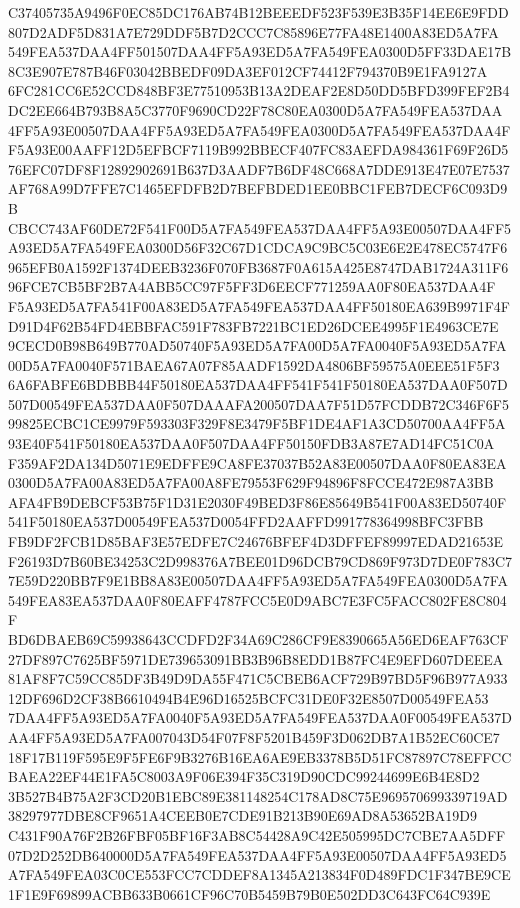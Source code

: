\documentclass[UTF8,fontset=fandol,zihao=-4,a4paper]{ctexart}
\begin{document}
{{C37405735A9496F0EC85DC176AB74B12BEEEDF523F539E3B35F14EE6E9FDD807D2ADF5D831A7E729DDF5B7D2CCC7C85896E77FA48E1400A83ED5A7FA
549FEA537DAA4FF501507DAA4FF5A93ED5A7FA549FEA0300D5FF33DAE17B8C3E907E787B46F03042BBEDF09DA3EF012CF74412F794370B9E1FA9127A
6FC281CC6E52CCD848BF3E77510953B13A2DEAF2E8D50DD5BFD399FEF2B4DC2EE664B793B8A5C3770F9690CD22F78C80EA0300D5A7FA549FEA537DAA
4FF5A93E00507DAA4FF5A93ED5A7FA549FEA0300D5A7FA549FEA537DAA4FF5A93E00AAFF12D5EFBCF7119B992BBECF407FC83AEFDA984361F69F26D5
76EFC07DF8F12892902691B637D3AADF7B6DF48C668A7DDE913E47E07E7537AF768A99D7FFE7C1465EFDFB2D7BEFBDED1EE0BBC1FEB7DECF6C093D9B
CBCC743AF60DE72F541F00D5A7FA549FEA537DAA4FF5A93E00507DAA4FF5A93ED5A7FA549FEA0300D56F32C67D1CDCA9C9BC5C03E6E2E478EC5747F6
965EFB0A1592F1374DEEB3236F070FB3687F0A615A425E8747DAB1724A311F696FCE7CB5BF2B7A4ABB5CC97F5FF3D6EECF771259AA0F80EA537DAA4F
F5A93ED5A7FA541F00A83ED5A7FA549FEA537DAA4FF50180EA639B9971F4FD91D4F62B54FD4EBBFAC591F783FB7221BC1ED26DCEE4995F1E4963CE7E
9CECD0B98B649B770AD50740F5A93ED5A7FA00D5A7FA0040F5A93ED5A7FA00D5A7FA0040F571BAEA67A07F85AADF1592DA4806BF59575A0EEE51F5F3
6A6FABFE6BDBBB44F50180EA537DAA4FF541F541F50180EA537DAA0F507D507D00549FEA537DAA0F507DAAAFA200507DAA7F51D57FCDDB72C346F6F5
99825ECBC1CE9979F593303F329F8E3479F5BF1DE4AF1A3CD50700AA4FF5A93E40F541F50180EA537DAA0F507DAA4FF50150FDB3A87E7AD14FC51C0A
F359AF2DA134D5071E9EDFFE9CA8FE37037B52A83E00507DAA0F80EA83EA0300D5A7FA00A83ED5A7FA00A8FE79553F629F94896F8FCCE472E987A3BB
AFA4FB9DEBCF53B75F1D31E2030F49BED3F86E85649B541F00A83ED50740F541F50180EA537D00549FEA537D0054FFD2AAFFD991778364998BFC3FBB
FB9DF2FCB1D85BAF3E57EDFE7C24676BFEF4D3DFFEF89997EDAD21653EF26193D7B60BE34253C2D998376A7BEE01D96DCB79CD869F973D7DE0F783C7
7E59D220BB7F9E1BB8A83E00507DAA4FF5A93ED5A7FA549FEA0300D5A7FA549FEA83EA537DAA0F80EAFF4787FCC5E0D9ABC7E3FC5FACC802FE8C804F
BD6DBAEB69C59938643CCDFD2F34A69C286CF9E8390665A56ED6EAF763CF27DF897C7625BF5971DE739653091BB3B96B8EDD1B87FC4E9EFD607DEEEA
81AF8F7C59CC85DF3B49D9DA55F471C5CBEB6ACF729B97BD5F96B977A93312DF696D2CF38B6610494B4E96D16525BCFC31DE0F32E8507D00549FEA53
7DAA4FF5A93ED5A7FA0040F5A93ED5A7FA549FEA537DAA0F00549FEA537DAA4FF5A93ED5A7FA007043D54F07F8F5201B459F3D062DB7A1B52EC60CE7
18F17B119F595E9F5FE6F9B3276B16EA6AE9EB3378B5D51FC87897C78EFFCCBAEA22EF44E1FA5C8003A9F06E394F35C319D90CDC99244699E6B4E8D2
3B527B4B75A2F3CD20B1EBC89E381148254C178AD8C75E969570699339719AD38297977DBE8CF9651A4CEEB0E7CDE91B213B90E69AD8A53652BA19D9
C431F90A76F2B26FBF05BF16F3AB8C54428A9C42E505995DC7CBE7AA5DFF07D2D252DB640000D5A7FA549FEA537DAA4FF5A93E00507DAA4FF5A93ED5
A7FA549FEA03C0CE553FCC7CDDEF8A1345A213834F0D489FDC1F347BE9CE1F1E9F69899ACBB633B0661CF96C70B5459B79B0E502DD3C643FC64C939E
}}
\end{document}
